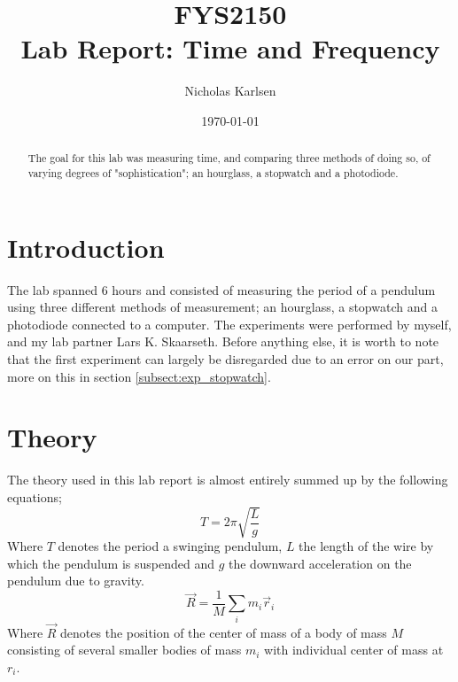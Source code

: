 \documentclass[%
 reprint,
 amsmath,amssymb,
 aps,
]{revtex4-1}
\begin{document}

\title{FYS2150 \\
Lab Report: Time and Frequency}%

\author{Nicholas Karlsen}

\date{\today}%

\begin{abstract}
The goal for this lab was measuring time, and comparing three methods of doing so, of varying degrees of "sophistication"; an hourglass, a stopwatch and a photodiode.
\end{abstract}

\maketitle


\section{\label{sec:intro}Introduction}
	The lab spanned 6 hours and consisted of measuring the period of a pendulum using three different methods of measurement; an hourglass, a stopwatch and a photodiode connected to a computer. The experiments were performed by myself, and my lab partner Lars K. Skaarseth.
	Before anything else, it is worth to note that the first experiment can largely be disregarded due to an error on our part, more on this in section \ref{subsect:exp_stopwatch}.

\section{Theory}
	The theory used in this lab report is almost entirely summed up by the following equations;
	\begin{equation}
        \label{eqn:period}
		T = 2\pi \sqrt{\frac{L}{g}}
	\end{equation}
	Where $T$ denotes the period a swinging pendulum, $L$ the length of the wire by which the pendulum is suspended and $g$ the downward acceleration on the pendulum due to gravity.
	\begin{equation}
		\vec R = \frac{1}{M} \sum_i m_i \vec r_i
	\end{equation}
	Where $\vec R$ denotes the position of the center of mass of a body of mass $M$ consisting of several smaller bodies of mass $m_i$ with individual center of mass at $r_i$.
\end{document}
